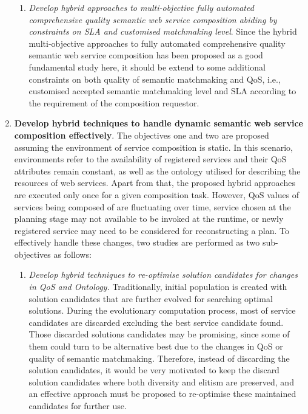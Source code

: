 \begin{enumerate}
\begin{enumerate}
    \item \emph{Develop hybrid approaches to multi-objective fully automated comprehensive quality semantic web service composition abiding by constraints on SLA and customised matchmaking level}. Since the hybrid multi-objective approaches to fully automated comprehensive quality semantic web service composition has been proposed as a good fundamental study here, it should be extend to some additional constraints on both quality of semantic matchmaking and QoS, i.e., customised accepted semantic matchmaking level and SLA according to the requirement of the composition requestor.
   \end{enumerate}
  
 \item \textbf{Develop hybrid techniques to handle dynamic semantic web service composition effectively}. The objectives one and two are proposed assuming the environment of service composition is static. In this scenario, environments refer to the availability of registered services and their QoS attributes remain constant, as well as the ontology utilised for describing the resources of web services. Apart from that,  the proposed hybrid approaches are executed only once for a given composition task. However, QoS values of services being composed of are fluctuating over time, service chosen at the planning stage may not available to be invoked at the runtime, or newly registered service may need to be considered for reconstructing a plan. To effectively handle these changes, two studies are performed as two sub-objectives as follows:

  \begin{enumerate}
 \item \emph{Develop hybrid techniques to re-optimise solution candidates for changes in QoS and Ontology.} Traditionally, initial population is created with solution candidates that are further evolved for searching optimal solutions. During the evolutionary computation process, most of service candidates are discarded excluding the best service candidate found. Those discarded solutions candidates may be promising, since some of them could turn to be alternative best due to the changes in QoS or quality of semantic matchmaking. Therefore, instead of discarding the solution candidates, it would be very motivated to keep the discard solution candidates where both diversity and elitism are preserved, and an effective approach must be proposed to re-optimise these maintained candidates for further use.
 

\end{enumerate}
\end{enumerate}
